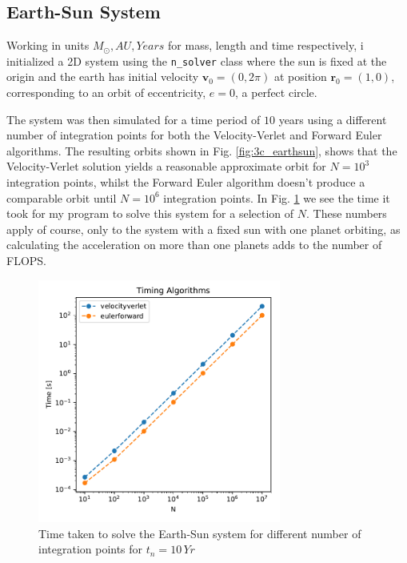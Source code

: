 \documentclass[10pt,showpacs,preprintnumbers,amsmath,amssymb,nofootinbib,aps,prl,twocolumn,groupedaddress,superscriptaddress,showkeys]{revtex4-1}
\begin{document}
  \subsection{Earth-Sun System}

    Working in units $M_\odot, AU, Years$ for mass, length and time respectively, i initialized a 2D system using the \lstinline{n_solver} class where the sun is fixed at the origin and the earth has initial velocity $\mathbf v_0 = (0, 2\pi)$ at position $\mathbf r_0 = (1, 0)$, corresponding to an orbit of eccentricity, $e=0$, a perfect circle.
    

    The system was then simulated for a time period of $10$ years using a different number of integration points for both the Velocity-Verlet and Forward Euler algorithms. The resulting orbits shown in Fig. \ref{fig:3c_earthsun}, shows that the Velocity-Verlet solution yields a reasonable approximate orbit for $N=10^3$ integration points, whilst the Forward Euler algorithm doesn't produce a comparable orbit until $N=10^6$ integration points. In Fig. \ref{fig:timing} we see the time it took for my program to solve this system for a selection of $N$. These numbers apply of course, only to the system with a fixed sun with one planet orbiting, as calculating the acceleration on more than one planets adds to the number of FLOPS.

    \begin{figure}[H]
      \center
      \includegraphics[width=8cm]{figs/timing_earthsun.pdf}
      \caption{Time taken to solve the Earth-Sun system for different number of integration points for $t_n=10\, Yr$}
      \label{fig:timing}
    \end{figure}
\end{document}
